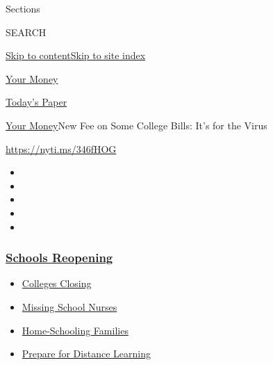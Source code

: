 Sections

SEARCH

\protect\hyperlink{site-content}{Skip to
content}\protect\hyperlink{site-index}{Skip to site index}

\href{https://www.nytimes3xbfgragh.onion/section/your-money}{Your Money}

\href{https://myaccount.nytimes3xbfgragh.onion/auth/login?response_type=cookie\&client_id=vi}{}

\href{https://www.nytimes3xbfgragh.onion/section/todayspaper}{Today's
Paper}

\href{/section/your-money}{Your Money}\textbar{}New Fee on Some College
Bills: It's for the Virus

\url{https://nyti.ms/346fHOG}

\begin{itemize}
\item
\item
\item
\item
\item
\end{itemize}

\hypertarget{schools-reopening}{%
\subsubsection{\texorpdfstring{\href{https://www.nytimes3xbfgragh.onion/spotlight/schools-reopening?name=styln-coronavirus-schools-reopening\&region=TOP_BANNER\&variant=undefined\&block=storyline_menu_recirc\&action=click\&pgtype=Article\&impression_id=14274e90-e384-11ea-bf7b-edaacc4ea387}{Schools
Reopening}}{Schools Reopening}}\label{schools-reopening}}

\begin{itemize}
\tightlist
\item
  \href{https://www.nytimes3xbfgragh.onion/2020/08/19/us/colleges-closing-covid.html?name=styln-coronavirus-schools-reopening\&region=TOP_BANNER\&variant=undefined\&block=storyline_menu_recirc\&action=click\&pgtype=Article\&impression_id=142775a0-e384-11ea-bf7b-edaacc4ea387}{Colleges
  Closing}
\item
  \href{https://www.nytimes3xbfgragh.onion/2020/08/20/us/schools-reopening-nurses-covid.html?name=styln-coronavirus-schools-reopening\&region=TOP_BANNER\&variant=undefined\&block=storyline_menu_recirc\&action=click\&pgtype=Article\&impression_id=142775a1-e384-11ea-bf7b-edaacc4ea387}{Missing
  School Nurses}
\item
  \href{https://www.nytimes3xbfgragh.onion/2020/08/18/parenting/homeschool-families.html?name=styln-coronavirus-schools-reopening\&region=TOP_BANNER\&variant=undefined\&block=storyline_menu_recirc\&action=click\&pgtype=Article\&impression_id=142775a2-e384-11ea-bf7b-edaacc4ea387}{Home-Schooling
  Families}
\item
  \href{https://www.nytimes3xbfgragh.onion/2020/08/05/parenting/parents-distance-learning.html?name=styln-coronavirus-schools-reopening\&region=TOP_BANNER\&variant=undefined\&block=storyline_menu_recirc\&action=click\&pgtype=Article\&impression_id=142775a3-e384-11ea-bf7b-edaacc4ea387}{Prepare
  for Distance Learning}
\end{itemize}

